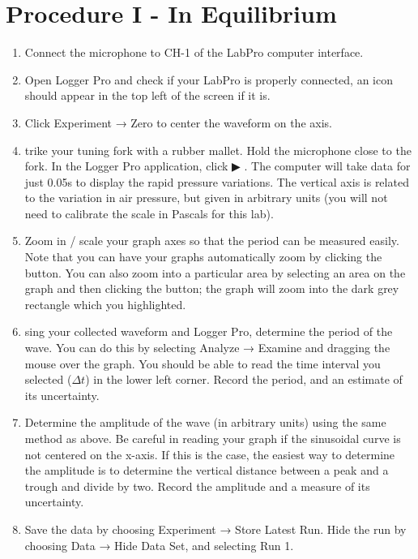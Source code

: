 

{}



\section{{Procedure I - In Equilibrium}}

{}

\begin{enumerate}
	\item {Connect the microphone to CH-1 of the LabPro computer interface.}
	\item {Open Logger Pro and check if your LabPro is properly connected, an icon should
appear in the top left of the screen if it is.}
	\item {Click Experiment → Zero to center the waveform on the axis.}
	\item {trike your tuning fork with a rubber mallet. Hold the microphone close to the fork. In the Logger Pro application, click ▶ . The computer will take data for just 0.05s to display the rapid pressure variations. The vertical axis is related to the variation in air pressure, but given in arbitrary units (you will not need to calibrate the scale in Pascals for this lab).}
	\item {Zoom in / scale your graph axes so that the period can be measured easily. Note that you can have your graphs automatically zoom by clicking the button. You can also zoom into a particular area by selecting an area on the graph and then clicking the button; the graph will zoom into the dark grey rectangle which you highlighted.}
	\item {sing your collected waveform and Logger Pro, determine the period of the wave. You can do this by selecting Analyze → Examine and dragging the mouse over the graph. You should be able to read the time interval you selected ($\Delta t$) in the lower left corner. Record the period, and an estimate of its uncertainty.}
	\item {Determine the amplitude of the wave (in arbitrary units) using the same method as above. Be careful in reading your graph if the sinusoidal curve is not centered on the x-axis. If this is the case, the easiest way to determine the amplitude is to determine the vertical distance between a peak and a trough and divide by two. Record the amplitude and a measure of its uncertainty.}
	\item {Save the data by choosing Experiment → Store Latest Run. Hide the run by
choosing Data → Hide Data Set, and selecting Run 1.}
\end{enumerate}

